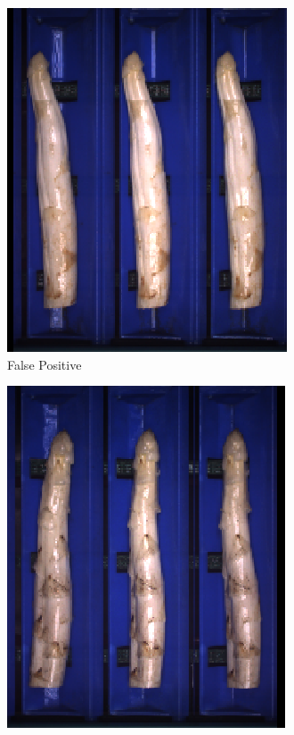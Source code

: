 \begin{figure}[!htb]
	\begin{subfigure}{0.3\textwidth}
		\includegraphics[width=0.9\linewidth]{Figures/chapter04/hollow_falsepositive_01.png}
		\vspace{-5pt}
		\caption{False Positive}
	\end{subfigure}
	\begin{subfigure}{0.3\textwidth}
		\includegraphics[width=0.9\linewidth]{Figures/chapter04/hollow_falsepositive_02.png}

\end{subfigure}
\end{figure}
